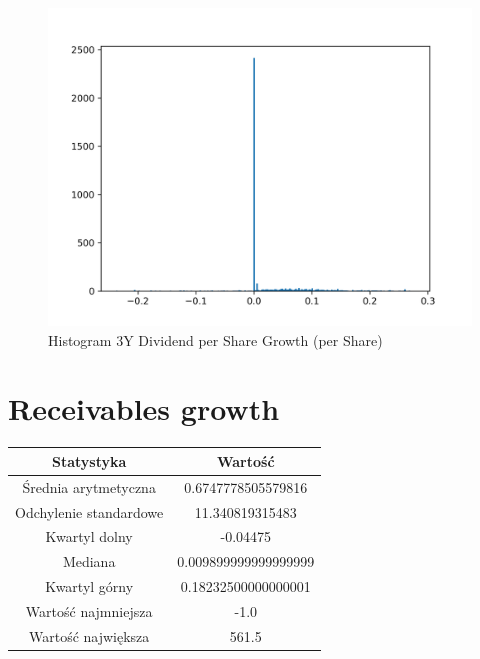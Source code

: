 \documentclass{article}
\begin{document}
\begin{figure}[h!]
    \includegraphics[width=\linewidth]{variables/3Y Dividend per Share Growth (per Share).png}
    \caption{Histogram 3Y Dividend per Share Growth (per Share) }
\end{figure}\section{ Receivables growth }

\begin{center}
    \begin{tabular}{|c | c|} 
    \hline
    Statystyka & Wartość \\
    \hline\hline
    Średnia arytmetyczna & 0.6747778505579816 \\ 
    \hline
    Odchylenie standardowe & 11.340819315483 \\
    \hline
    Kwartyl dolny & -0.04475 \\
    \hline
    Mediana & 0.009899999999999999 \\
    \hline
    Kwartyl górny & 0.18232500000000001 \\
    \hline
    Wartość najmniejsza & -1.0 \\
    \hline
    Wartość największa & 561.5 \\
    \hline
   \end{tabular}
\end{center}
\end{document}
